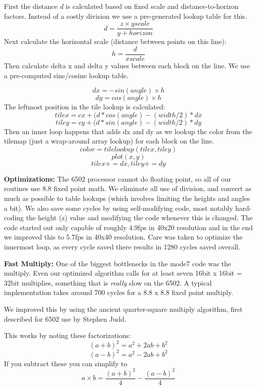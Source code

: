 \documentclass[twocolumn]{article}
\begin{document}
First the distance {\em d} is calculated based on fixed scale and
distance-to-horizon factors.  
Instead of a costly division we use a pre-generated lookup table for this.
	\[d = \frac{z \times yscale}{y+horizon}\]
Next calculate the horizontal scale (distance between points on 
this line):
	\[h = \frac{d}{xscale}\]
Then calculate delta x and delta y values between each block on the line.
We use a pre-computed sine/cosine lookup table.

\pagebreak

	\[dx = -sin(angle) \times h\]
	\[dy = cos(angle) \times h\]
The leftmost position in the tile lookup is calculated:
	\[tilex = cx + (d*cos(angle) - (width/2) * dx\]
	\[tiley = cy + (d*sin(angle) - (width/2) * dy\]
Then an inner loop happens that adds dx and dy as we lookup the color
from the tilemap (just a wrap-around array lookup) for each block
on the line.
	\[color = tilelookup(tilex,tiley)\]
	\[plot (x, y) \]
	\[tilex += dx, tiley+= dy\]

\noindent
{\bf Optimizations:}
The 6502 processor cannot do floating point, so all of our routines use
8.8 fixed point math.
We eliminate all use of division, and convert as much as possible
to table lookups (which involves limiting the heights and angles a bit).
We also save some cycles by using self-modifying code,
most notably hard-coding the height (z) value and modifying the code
whenever this is changed.
The code started out only capable of roughly 4.9fps in 40x20 resolution
and in the end we improved this to 5.7fps in 40x40 resolution.
Care was taken to optimize the innermost loop, as every cycle saved there
results in 1280 cycles saved overall.

\noindent
{\bf Fast Multiply:}
One of the biggest bottlenecks in the mode7 code was the multiply.
Even our optimized algorithm calls for at least seven
16bit x 16bit = 32bit multiplies, something that is {\em really} slow on 
the 6502.
A typical implementation takes around 700 cycles
for a 8.8 x 8.8 fixed point multiply.


We improved this by using the ancient quarter-square 
multiply algorithm, first described for 6502 use by Stephen Judd.

This works by noting these factorizations:
	\[(a+b)^{2} = a^{2}+2ab+b^{2}\]
	\[(a-b)^{2}=a^{2}-2ab+b^{2}\]
If you subtract these you can simplify to
	\[a\times b =\frac{(a+b)^{2}}{4} - \frac{(a-b)^2}{4}\]
\end{document}
